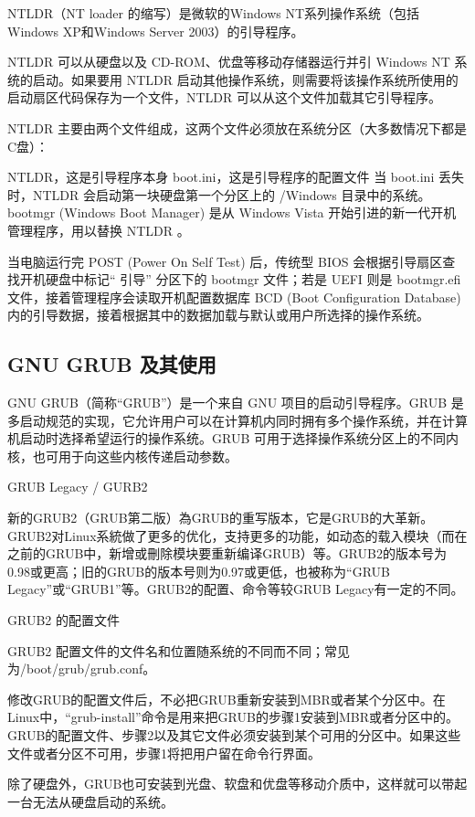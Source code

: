 \documentclass[doctor,openright,twoside]{sjtuthesis}
\theoremstyle{plain}
\theoremstyle{definition}
\theoremstyle{remark}
\theoremstyle{ocrenumbox}
\theoremstyle{plain}
\begin{document}
NTLDR（NT loader 的缩写）是微软的Windows NT系列操作系统（包括Windows XP和Windows Server 2003）的引导程序。

NTLDR 可以从硬盘以及 CD-ROM、优盘等移动存储器运行并引 Windows NT 系统的启动。如果要用 NTLDR 启动其他操作系统，则需要将该操作系统所使用的启动扇区代码保存为一个文件，NTLDR 可以从这个文件加载其它引导程序。

NTLDR 主要由两个文件组成，这两个文件必须放在系统分区（大多数情况下都是C盘）：

NTLDR，这是引导程序本身 boot.ini，这是引导程序的配置文件 当 boot.ini 丢失时，NTLDR 会启动第一块硬盘第一个分区上的 /Windows 目录中的系统。 bootmgr (Windows Boot Manager) 是从 Windows Vista 开始引进的新一代开机管理程序，用以替换 NTLDR 。

当电脑运行完 POST (Power On Self Test) 后，传统型 BIOS 会根据引导扇区查找开机硬盘中标记`` 引导'' 分区下的 bootmgr 文件；若是 UEFI 则是 bootmgr.efi 文件，接着管理程序会读取开机配置数据库 BCD (Boot Configuration Database) 内的引导数据，接着根据其中的数据加载与默认或用户所选择的操作系统。

\hypertarget{gnu-grub-}{%
\subsection{GNU GRUB 及其使用}\label{gnu-grub-}}

GNU GRUB（简称``GRUB''）是一个来自 GNU 项目的启动引导程序。GRUB 是多启动规范的实现，它允许用户可以在计算机内同时拥有多个操作系统，并在计算机启动时选择希望运行的操作系统。GRUB 可用于选择操作系统分区上的不同内核，也可用于向这些内核传递启动参数。

GRUB Legacy / GURB2

新的GRUB2（GRUB第二版）為GRUB的重写版本，它是GRUB的大革新。GRUB2对Linux系統做了更多的优化，支持更多的功能，如动态的载入模块（而在之前的GRUB中，新增或刪除模块要重新编译GRUB）等。GRUB2的版本号为0.98或更高；旧的GRUB的版本号则为0.97或更低，也被称为``GRUB Legacy''或``GRUB1''等。GRUB2的配置、命令等较GRUB Legacy有一定的不同。

GRUB2 的配置文件

GRUB2 配置文件的文件名和位置随系统的不同而不同；常见为/boot/grub/grub.conf。

修改GRUB的配置文件后，不必把GRUB重新安装到MBR或者某个分区中。在Linux中，``grub-install''命令是用来把GRUB的步骤1安装到MBR或者分区中的。GRUB的配置文件、步骤2以及其它文件必须安装到某个可用的分区中。如果这些文件或者分区不可用，步骤1将把用户留在命令行界面。

除了硬盘外，GRUB也可安装到光盘、软盘和优盘等移动介质中，这样就可以带起一台无法从硬盘启动的系统。
\end{document}
